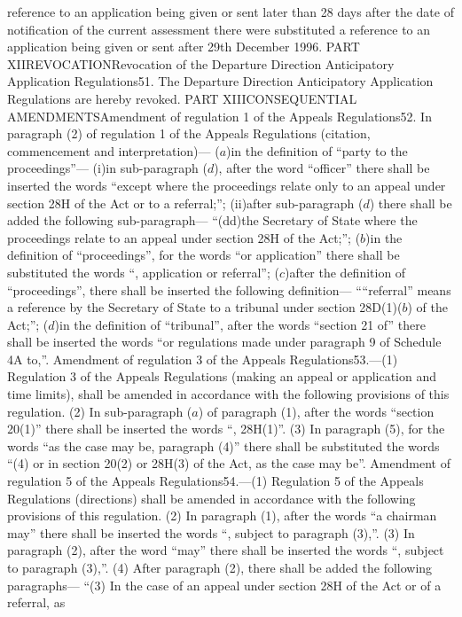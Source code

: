 \documentclass[a4paper]{article}
\begin{document}
reference to an application being given or sent later than 28 days after the
date of notification of the current assessment there were substituted a
reference to an application being given or sent after 29th December 1996.
PART XIIREVOCATIONRevocation of the Departure Direction Anticipatory Application
Regulations51. The Departure Direction Anticipatory Application Regulations are
hereby revoked.
PART XIIICONSEQUENTIAL AMENDMENTSAmendment of regulation 1 of the Appeals
Regulations52. In paragraph (2) of regulation 1 of the Appeals Regulations
(citation, commencement and interpretation)—
($a$)in the definition of “party to the proceedings”—
(i)in sub-paragraph ($d$), after the word “officer” there shall be inserted the
words “except where the proceedings relate only to an appeal under section 28H
of the Act or to a referral;”;
(ii)after sub-paragraph ($d$) there shall be added the following sub-paragraph—
“(dd)the Secretary of State where the proceedings relate to an appeal under
section 28H of the Act;”;
($b$)in the definition of “proceedings”, for the words “or application” there
shall be substituted the words “, application or referral”;
($c$)after the definition of “proceedings”, there shall be inserted the following
definition—
““referral” means a reference by the Secretary of State to a tribunal under
section 28D(1)($b$) of the Act;”;
($d$)in the definition of “tribunal”, after the words “section 21 of” there shall
be inserted the words “or regulations made under paragraph 9 of Schedule 4A
to,”.
Amendment of regulation 3 of the Appeals Regulations53.—(1) Regulation 3 of the
Appeals Regulations (making an appeal or application and time limits), shall be
amended in accordance with the following provisions of this regulation.
(2) In sub-paragraph ($a$) of paragraph (1), after the words “section 20(1)” there
shall be inserted the words “, 28H(1)”.
(3) In paragraph (5), for the words “as the case may be, paragraph (4)” there
shall be substituted the words “(4) or in section 20(2) or 28H(3) of the Act, as
the case may be”.
Amendment of regulation 5 of the Appeals Regulations54.—(1) Regulation 5 of the
Appeals Regulations (directions) shall be amended in accordance with the
following provisions of this regulation.
(2) In paragraph (1), after the words “a chairman may” there shall be inserted
the words “, subject to paragraph (3),”.
(3) In paragraph (2), after the word “may” there shall be inserted the words “,
subject to paragraph (3),”.
(4) After paragraph (2), there shall be added the following paragraphs—
“(3) In the case of an appeal under section 28H of the Act or of a referral, as
\end{document}

